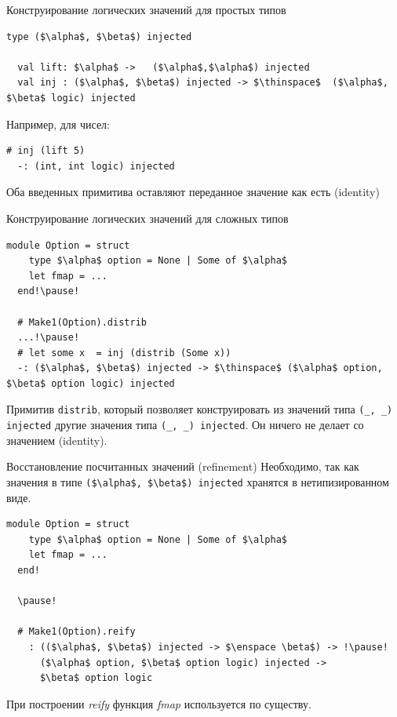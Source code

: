 \documentclass[10pt, mathserif]{beamer}
\theoremstyle{definition}
\begin{document}
\begin{frame}[fragile]{Конструирование логических значений для простых типов}
  \begin{lstlisting}[mathescape=true]
  type ($\alpha$, $\beta$) injected

  val lift: $\alpha$ ->   ($\alpha$,$\alpha$) injected
  val inj : ($\alpha$, $\beta$) injected -> $\thinspace$  ($\alpha$, $\beta$ logic) injected
  \end{lstlisting}
  \pause\vskip 1cm
  Например, для чисел:
  \begin{lstlisting}[mathescape=true]
  # inj (lift 5)
  -: (int, int logic) injected
  \end{lstlisting}
  \pause
  Оба введенных примитива оставляют переданное значение как есть (identity)
\end{frame}

\begin{frame}[fragile]{Конструирование логических значений для сложных типов}
  \begin{lstlisting}[mathescape=true]
  module Option = struct
    type $\alpha$ option = None | Some of $\alpha$
    let fmap = ...
  end!\pause!

  # Make1(Option).distrib
  ...!\pause!
  # let some x  = inj (distrib (Some x))
  -: ($\alpha$, $\beta$) injected -> $\thinspace$ ($\alpha$ option, $\beta$ option logic) injected
  \end{lstlisting}
  \pause

  Примитив \lstinline{distrib}, который позволяет конструировать из значений типа \lstinline{(_, _) injected} 
  другие значения типа \lstinline{(_, _) injected}.
  \vskip 1cm
  Он ничего не делает со значением (identity).
  

\end{frame}

\begin{frame}[fragile]{Восстановление посчитанных значений (refinement)}
  Необходимо, так как значения в типе \lstinline[mathescape=true]{($\alpha$, $\beta$) injected} хранятся в
  нетипизированном виде.

  \begin{lstlisting}[mathescape=true]
  module Option = struct
    type $\alpha$ option = None | Some of $\alpha$
    let fmap = ...
  end!

  \pause!

  # Make1(Option).reify
    : (($\alpha$, $\beta$) injected -> $\enspace \beta$) -> !\pause!
      ($\alpha$ option, $\beta$ option logic) injected -> 
      $\beta$ option logic

  \end{lstlisting}

  При построении \emph{reify} функция \emph{fmap} используется по существу.
\end{frame}
\end{document}

